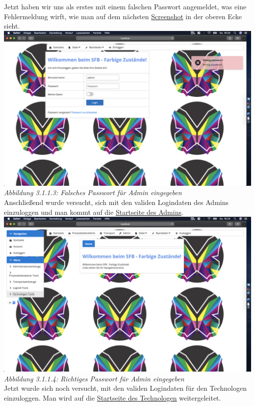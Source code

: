 \documentclass[enabledeprecatedfontcommands,fontsize=12pt,paper=a4,twoside]{scrartcl}
\begin{document}
Jetzt haben wir uns als erstes mit einem falschen Passwort angemeldet, was eine Fehlermeldung wirft, wie man auf dem nächsten  \hyperlink{sc3.1.1.3}{Screenshot} in der oberen Ecke sieht.\\

\hypertarget{sc3.1.1.3}{
\includegraphics[width=1\textwidth]{Screenshots/311wrongPassword.png}
\textit{Abbildung 3.1.1.3: Falsches Passwort für Admin eingegeben}
} \\

Anschließend wurde versucht, sich mit den validen Logindaten des Admins einzuloggen und man kommt auf die \hyperlink{sc3.1.1.4}{Startseite des Admins}. \\

\hypertarget{sc3.1.1.4}{
\includegraphics[width=1\textwidth]{Screenshots/311AdminView.png}
\textit{Abbildung 3.1.1.4: Richtiges Passwort für Admin eingegeben}
} \\

Jetzt wurde sich noch versucht, mit den validen Logindaten für den Technologen einzuloggen. Man wird auf die \hyperlink{sc3.1.1.5}{Startseite des Technologen} weitergeleitet. \\
\end{document}
